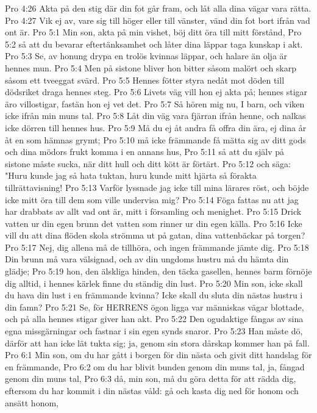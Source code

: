 Pro 4:26  Akta på den stig där din fot går fram, och låt alla dina vägar vara rätta.
Pro 4:27  Vik ej av, vare sig till höger eller till vänster, vänd din fot bort ifrån vad ont är.
Pro 5:1  Min son, akta på min vishet, böj ditt öra till mitt förstånd,
Pro 5:2  så att du bevarar eftertänksamhet och låter dina läppar taga kunskap i akt.
Pro 5:3  Se, av honung drypa en trolös kvinnas läppar, och halare än olja är hennes mun.
Pro 5:4  Men på sistone bliver hon bitter såsom malört och skarp såsom ett tveeggat svärd.
Pro 5:5  Hennes fötter styra nedåt mot döden till dödsriket draga hennes steg.
Pro 5:6  Livets väg vill hon ej akta på; hennes stigar äro villostigar, fastän hon ej vet det.
Pro 5:7  Så hören mig nu, I barn, och viken icke ifrån min muns tal.
Pro 5:8  Låt din väg vara fjärran ifrån henne, och nalkas icke dörren till hennes hus.
Pro 5:9  Må du ej åt andra få offra din ära, ej dina år åt en som hämnas grymt;
Pro 5:10  må icke främmande få mätta sig av ditt gods och dina mödors frukt komma i en annans hus,
Pro 5:11  så att du själv på sistone måste sucka, när ditt hull och ditt kött är förtärt.
Pro 5:12  och säga: "Huru kunde jag så hata tuktan, huru kunde mitt hjärta så förakta tillrättavisning!
Pro 5:13  Varför lyssnade jag icke till mina lärares röst, och böjde icke mitt öra till dem som ville undervisa mig?
Pro 5:14  Föga fattas nu att jag har drabbats av allt vad ont är, mitt i församling och menighet.
Pro 5:15  Drick vatten ur din egen brunn det vatten som rinner ur din egen källa.
Pro 5:16  Icke vill du att dina flöden skola strömma ut på gatan, dina vattenbäckar på torgen?
Pro 5:17  Nej, dig allena må de tillhöra, och ingen främmande jämte dig.
Pro 5:18  Din brunn må vara välsignad, och av din ungdoms hustru må du hämta din glädje;
Pro 5:19  hon, den älskliga hinden, den täcka gasellen, hennes barm förnöje dig alltid, i hennes kärlek finne du ständig din lust.
Pro 5:20  Min son, icke skall du hava din lust i en främmande kvinna? Icke skall du sluta din nästas hustru i din famn?
Pro 5:21  Se, för HERRENS ögon ligga var människas vägar blottade, och på alla hennes stigar giver han akt.
Pro 5:22  Den ogudaktige fångas av sina egna missgärningar och fastnar i sin egen synds snaror.
Pro 5:23  Han måste dö, därför att han icke lät tukta sig; ja, genom sin stora dårskap kommer han på fall.
Pro 6:1  Min son, om du har gått i borgen för din nästa och givit ditt handslag för en främmande,
Pro 6:2  om du har blivit bunden genom din muns tal, ja, fångad genom din muns tal,
Pro 6:3  då, min son, må du göra detta för att rädda dig, eftersom du har kommit i din nästas våld: gå och kasta dig ned för honom och ansätt honom,
